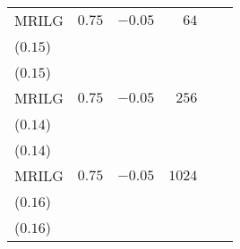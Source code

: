 \begin{table}[t]
\begin{tabular}{lrrrrr}
MRILG & \(0.75\) & \(-0.05\) & \(64\) & \longcell{\(0.28\)\\{\tiny(\(0.15\))}} & \longcell{\(0.28\)\\{\tiny(\(0.15\))}} \\[2.2ex]
MRILG & \(0.75\) & \(-0.05\) & \(256\) & \longcell{\(0.26\)\\{\tiny(\(0.14\))}} & \longcell{\(0.27\)\\{\tiny(\(0.14\))}} \\[2.2ex]
MRILG & \(0.75\) & \(-0.05\) & \(1024\) & \longcell{\(0.21\)\\{\tiny(\(0.16\))}} & \longcell{\(0.21\)\\{\tiny(\(0.16\))}} \\
\bottomrule
\end{tabular}
\end{table}
